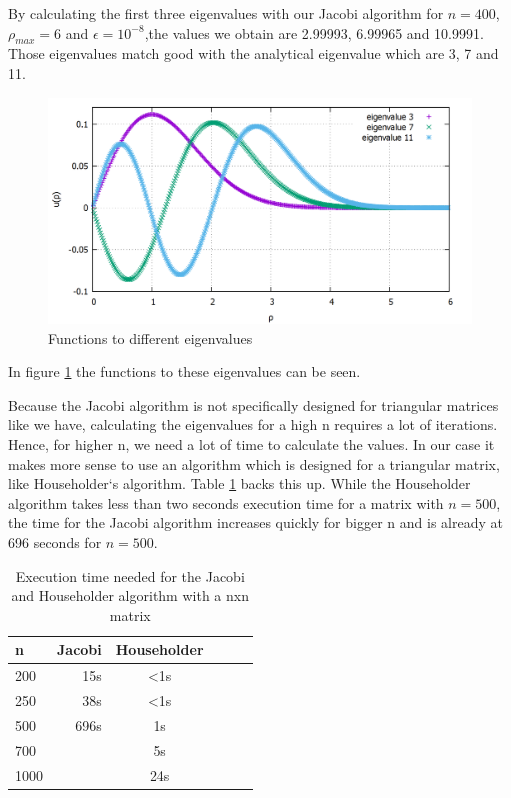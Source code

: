 \documentclass[10pt,a4paper]{article}
\begin{document}
By calculating the first three eigenvalues with our Jacobi algorithm for $n = 400$, $\rho_{max} = 6$ and $\epsilon = 10^{-8}$,the values we obtain are 2.99993, 6.99965 and 10.9991. Those eigenvalues match good with the analytical eigenvalue which are 3, 7 and 11.

\begin{figure}[h]
	\includegraphics[scale = 0.25]{tvJacobi_comparison_thick.png}
	\centering
	\caption{Functions to different eigenvalues}
	\label{plot1el}
\end{figure}

In figure \ref{plot1el} the functions to these eigenvalues can be seen.

Because the Jacobi algorithm is not specifically designed for triangular matrices like we have, calculating the eigenvalues for a high n requires a lot of iterations. Hence, for higher n, we need a lot of time to calculate the values. In our case it makes more sense to use an algorithm which is designed for a triangular matrix, like Householder`s algorithm. Table \ref{executiontime} backs this up. While the Householder algorithm takes less than two seconds execution time for a matrix with $n = 500$, the time for the Jacobi algorithm increases quickly for bigger n and is already at 696 seconds for $n = 500$.

\begin{table}[h!]
	\centering
	\begin{tabular}{|l|r|c|lrp{16cm}}\hline
		n & Jacobi & Householder\\\hline
		200 & 15s & <1s\\
		250 & 38s & <1s\\
		500 & 696s & 1s\\
		700 & & 5s \\
		1000 & & 24s\\\hline
	\end{tabular}
	\caption{Execution time needed for the Jacobi and Householder algorithm with a nxn matrix }
	\label{executiontime}
\end{table}
\end{document}
